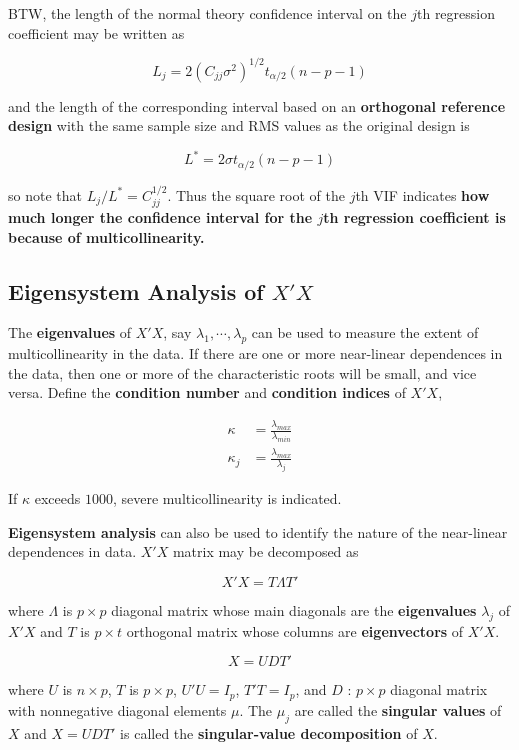 \documentclass[12pt]{article}
\begin{document}
BTW, the length of the normal theory confidence interval on the $j$th regression coefficient may be written as 

$$
L_j = 2 (C_{jj} \sigma^2)^{1/2} t_{\alpha/2} (n-p-1)
$$

and the length of the corresponding interval based on an \textbf{orthogonal reference design} with the same sample size and RMS values as the original design is 

$$
L^\ast = 2 \sigma t_{\alpha/2} (n-p-1)
$$

so note that $L_j / L^\ast = C_{jj}^{1/2}$. Thus the square root of the $j$th VIF indicates \textbf{how much longer the confidence interval for the $j$th regression coefficient is because of multicollinearity.} 




\subsection{Eigensystem Analysis of $X'X$}

The \textbf{eigenvalues} of $X'X$, say $\lambda_1, \cdots, \lambda_p$ can be used to measure the extent of multicollinearity in the data. If there are one or more near-linear dependences in the data, then one or more of the characteristic roots will be small, and vice versa. Define the \textbf{condition number} and \textbf{condition indices} of $X'X$, 


$$
\begin{aligned}
\kappa &= \frac{\lambda_{max}}{\lambda_{min}} \\[8pt]
\kappa_j &= \frac{\lambda_{max}}{\lambda_j}
\end{aligned}
$$

If $\kappa$ exceeds $1000$, severe multicollinearity is indicated. 

\textbf{Eigensystem analysis} can also be used to identify the nature of the near-linear dependences in data. $X'X$ matrix may be decomposed as 

$$
X'X = T \Lambda T'
$$

where $\Lambda$ is $p \times p$ diagonal matrix whose main diagonals are the \textbf{eigenvalues} $\lambda_j$ of $X'X$ and $T$ is $p \times t$ orthogonal matrix whose columns are \textbf{eigenvectors} of $X'X$. 


$$
X = UDT'
$$

where $U$ is $n \times p$, $T$ is $p \times p$, $U'U = I_p$, $T'T=I_p$, and $D$ : $p \times p$ diagonal matrix with nonnegative diagonal elements $\mu$. The $\mu_j$ are called the \textbf{singular values} of $X$ and $X = UDT'$ is called the \textbf{singular-value decomposition} of $X$. 
\end{document}

